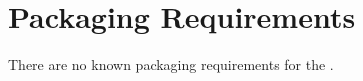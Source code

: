\KNEADSECTIONNEWPAGE
\section{Packaging Requirements}
\label{lab:sec_Packaging}
% 



There are no known packaging requirements for the \ThisSystem.

%
